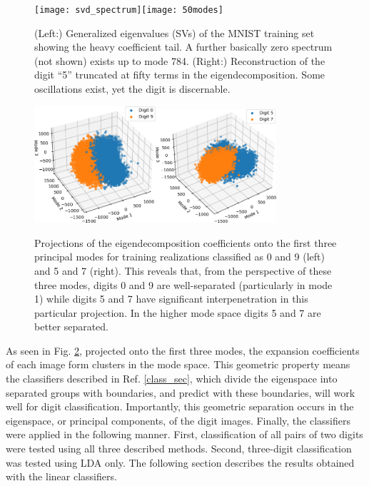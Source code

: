 \documentclass{article}
\begin{document}
\begin{figure}[b!]
  \centering
  \texttt{[image: svd\_spectrum]}\quad\quad\quad\texttt{[image: 50modes]}
  \caption{(Left:) Generalized eigenvalues (SVs) of the MNIST training set showing the heavy coefficient tail. A further basically zero spectrum (not shown) exists up to mode 784. (Right:) Reconstruction of the digit ``5'' truncated at fifty terms in the eigendecomposition. Some oscillations exist, yet the digit is discernable.}\label{spec_modes}
\end{figure}

\begin{figure}[t!]
  \centering
  \includegraphics[width=0.4\textwidth]{modes_3d_09}\quad\quad\quad\includegraphics[width=0.4\textwidth]{modes_3d_57}
  \caption{Projections of the eigendecomposition coefficients onto the first three principal modes for training realizations classified as 0 and 9 (left) and 5 and 7 (right). This reveals that, from the perspective of these three modes, digits 0 and 9 are well-separated (particularly in mode 1) while digits 5 and 7 have significant interpenetration in this particular projection. In the higher mode space digits 5 and 7 are better separated.}\label{sep}
\end{figure}

As seen in Fig. \ref{sep}, projected onto the first three modes, the expansion coefficients of each image form clusters in the mode space. This geometric property means the classifiers described in Ref. \ref{class_sec}, which divide the eigenspace into separated groups with boundaries, and predict with these boundaries, will work well for digit classification. Importantly, this geometric separation occurs in the eigenspace, or principal components, of the digit images. Finally, the classifiers were applied in the following manner. First, classification of all pairs of two digits were tested using all three described methods. Second, three-digit classification was tested using LDA only. The following section describes the results obtained with the linear classifiers.
\end{document}
